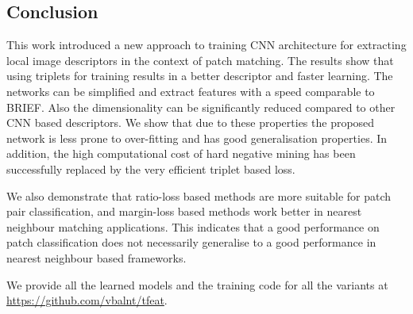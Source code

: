 \subsection{Conclusion}
This work introduced a new approach to training CNN architecture for
extracting local image descriptors in the context of patch matching.
The results show that using triplets for training results in a better
descriptor and faster learning. The networks can be simplified and
extract features with a speed comparable to BRIEF.  Also the
dimensionality can be significantly reduced compared to other CNN
based descriptors. We show that due to these properties the proposed
network is less prone to over-fitting and has good generalisation
properties.  In addition, the high computational cost of hard negative
mining has been successfully replaced by the very efficient triplet
based loss.

We also demonstrate that ratio-loss based methods are more suitable
for patch pair classification, and margin-loss based methods work
better in nearest neighbour matching applications.  This indicates
that a good performance on patch classification does not necessarily
generalise to a good performance in nearest neighbour based
frameworks.

We provide all the learned models and the training code for all the
variants at \url{https://github.com/vbalnt/tfeat}. 
